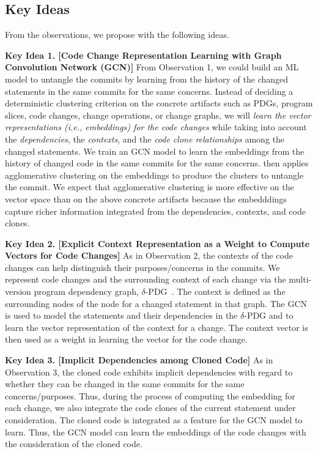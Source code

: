\subsection{Key Ideas}
\label{ideas:sec}

From the observations, we propose {\tool} with the following ideas.

{\bf Key Idea 1. [Code Change Representation Learning with Graph
    Convolution Network (GCN)]} From Observation 1, we could build an
ML model to untangle the commits by learning from the history of the
changed statements in the same commits for the same concerns. Instead
of deciding a deterministic clustering criterion on the concrete
artifacts such as PDGs, program slices, code changes, change
operations, or change graphs, we will {\em learn the vector
  representations (i.e., embeddings) for the code changes} while
taking into account the {\em dependencies}, the {\em contexts}, and
the {\em code clone relationships} among the changed statements. We
train an GCN model to learn the embeddings from the history of changed
code in the same commits for the same concerns. {\tool} then applies
agglomerative clustering on the embeddings to produce the clusters to
untangle the commit. We expect that agglomerative clustering is more
effective on the vector space than on the above concrete artifacts
because the embedddings capture richer information integrated from the
dependencies, contexts, and code clones.


{\bf Key Idea 2. [Explicit Context Representation as a Weight to
    Compute Vectors for Code Changes]} As in Observation 2, the
contexts of the code changes can help distinguish their
purposes/concerns in the commits. We represent code changes and the
surrounding context of each change via the multi-version program
dependency graph, $\delta$-PDG~\cite{flexeme-fse20}. The context is
defined as the surrounding nodes of the node for a changed statement
in that graph. The GCN is used to model the statements and their
dependencies in the $\delta$-PDG and to learn the vector
representation of the context for a change. The context vector is then
used as a weight in learning the vector for the code change.

{\bf Key Idea 3. [Implicit Dependencies among Cloned Code]} As in
Observation 3, the cloned code exhibits implicit dependencies with
regard to whether they can be changed in the same commits for the same
concerns/purposes. Thus, during the process of computing the embedding
for each change, we also integrate the code clones of the current
statement under consideration. The cloned code is integrated as a
feature for the GCN model to learn. Thus, the GCN model can learn the
embeddings of the code changes with the consideration of the cloned
code.
